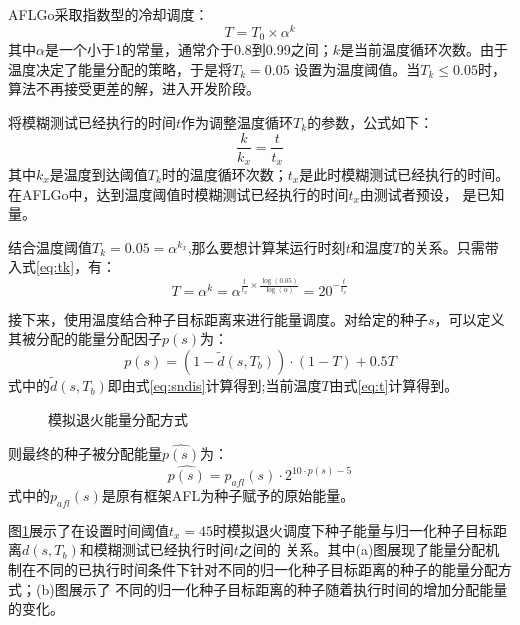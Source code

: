 \documentclass[bachelor]{njupthesis}
\begin{document}
AFLGo采取指数型的冷却调度：
\begin{equation}
	T=T_0 \times \alpha^k	
\end{equation}
其中$\alpha$是一个小于1的常量，通常介于0.8到0.99之间；$k$是当前温度循环次数。由于温度决定了能量分配的策略，于是将$T_k=0.05$
设置为温度阈值。当$T_k \leq 0.05$时，算法不再接受更差的解，进入开发阶段。

将模糊测试已经执行的时间$t$作为调整温度循环$T_k$的参数，公式如下：
\begin{equation}\label{eq:tk}
	\frac{k}{k_x}=\frac{t}{t_x}	
\end{equation}
其中$k_x$是温度到达阈值$T_k$时的温度循环次数；$t_x$是此时模糊测试已经执行的时间。在AFLGo中，达到温度阈值时模糊测试已经执行的时间$t_x$由测试者预设，
是已知量。

结合温度阈值$T_k=0.05=\alpha^{k_x}$,那么要想计算某运行时刻$t$和温度$T$的关系。只需带入式\ref{eq:tk}，有：
\begin{equation}\label{eq:t}
	T=\alpha^k=\alpha^{\frac{t}{t_x}\times\frac{\log(0.05)}{\log(\alpha)}}=20^{-\frac{t}{t_x}}
\end{equation}

接下来，使用温度结合种子目标距离来进行能量调度。对给定的种子$s$，可以定义其被分配的能量分配因子$p(s)$为：
\begin{equation}\label{eq:energy}
	p(s)=(1-\widetilde{d}(s,T_b))\cdot(1-T)+0.5T
\end{equation}
式中的$\widetilde{d}(s,T_b)$即由式\ref{eq:sndis}计算得到;当前温度$T$由式\ref{eq:t}计算得到。

\begin{figure}[htb]
	\centering
	\caption{模拟退火能量分配方式}
 	\label{pic:dis}
\end{figure}

则最终的种子被分配能量$\hat{p(s)}$为：
\begin{equation}
	\hat{p(s)}=p_{afl}(s)\cdot 2^{10\cdot p(s)-5}	
\end{equation}
式中的$p_{afl}(s)$是原有框架AFL为种子赋予的原始能量。

图\ref{pic:dis}展示了在设置时间阈值$t_x=45$时模拟退火调度下种子能量与归一化种子目标距离$d(s,T_b)$和模糊测试已经执行时间$t$之间的
关系。其中(a)图展现了能量分配机制在不同的已执行时间条件下针对不同的归一化种子目标距离的种子的能量分配方式；(b)图展示了
不同的归一化种子目标距离的种子随着执行时间的增加分配能量的变化。
\end{document}
